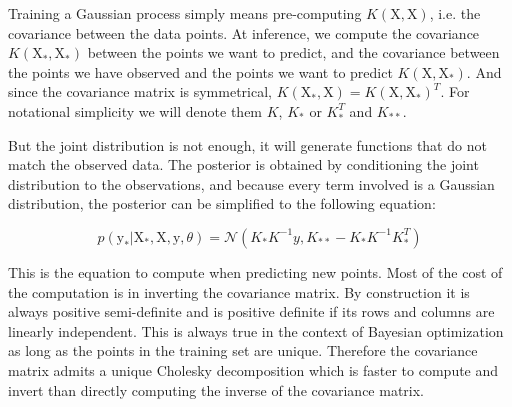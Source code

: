 Training a Gaussian process simply means pre-computing $K(\mathrm{X}, \mathrm{X})$, i.e. the covariance between the data points. At inference, we compute the covariance $K(\mathrm{X_*}, \mathrm{X_*})$ between the points we want to predict, and the covariance between the points we have observed and the points we want to predict $K(\mathrm{X}, \mathrm{X_*})$. And since the covariance matrix is symmetrical, $K(\mathrm{X_*}, \mathrm{X}) = K(\mathrm{X}, \mathrm{X_*})^T$. For notational simplicity we will denote them $K$, $K_*$ or $K_*^T$ and $K_{**}$.

But the joint distribution is not enough, it will generate functions that do not match the observed data. The posterior is obtained by conditioning the joint distribution to the observations, and because every term involved is a Gaussian distribution, the posterior can be simplified to the following equation:

\begin{equation}
    p\left( \mathrm{y_*} | \mathrm{X_*}, \mathrm{X}, \mathrm{y}, \theta \right)
    =
    \mathcal{N} \left( K_* K^{-1} y, 
    K_{**} - K_* K^{-1} K_*^T \right)
\end{equation}

This is the equation to compute when predicting new points. Most of the cost of the computation is in inverting the covariance matrix. By construction it is always positive semi-definite and is positive definite if its rows and columns are linearly independent. This is always true in the context of Bayesian optimization as long as the points in the training set are unique. Therefore the covariance matrix admits a unique Cholesky decomposition which is faster to compute and invert than directly computing the inverse of the covariance matrix. 

